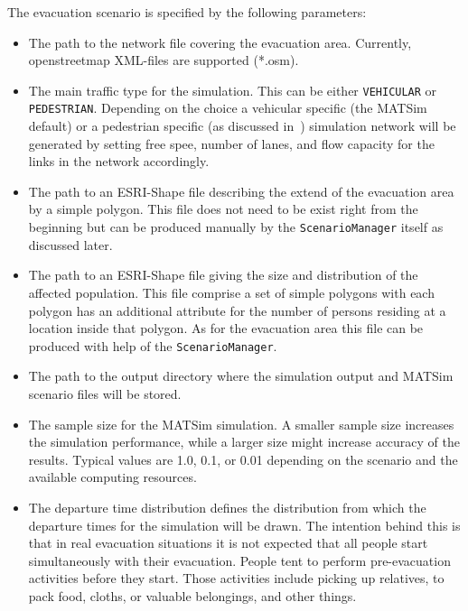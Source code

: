 The evacuation scenario is specified by the following parameters:
\begin{itemize}
\item The path to the network file covering the evacuation area. Currently, openstreetmap XML-files are supported (*.osm).
\item The main traffic type for the simulation. This can be either \lstinline+VEHICULAR+ or \lstinline+PEDESTRIAN+. Depending on the choice a vehicular specific (the MATSim default) or a pedestrian specific (as discussed in~\citet{LaemmelKluepfelNagel2009EvacPadangAtBookTimmermanns,Laemmel_PhDThesis_2011}) simulation network will be generated by setting free spee, number of lanes, and flow capacity for the links in the network accordingly.
\item The path to an ESRI-Shape file describing the extend of the evacuation area by a simple polygon. This file does not need to be exist right from the beginning but can be produced manually by the \lstinline+ScenarioManager+ itself as discussed later.
\item The path to an ESRI-Shape file giving the size and distribution of the affected population. This file comprise a set of simple polygons with each polygon has an additional attribute for the number of persons residing at a location inside that polygon. As for the evacuation area this file can be produced with help of the  \lstinline+ScenarioManager+.
\item The path to the output directory where the simulation output and MATSim scenario files will be stored.
\item The sample size for the MATSim simulation. A smaller sample size increases the simulation performance, while a larger size might increase accuracy of the results. Typical values are 1.0, 0.1, or 0.01 depending on the scenario and the available computing resources.
\item The departure time distribution defines the distribution from which the departure times for the simulation will be drawn. The intention behind this is that in real evacuation situations it is not expected that all people start simultaneously with their evacuation. 
People tent to perform pre-evacuation activities before they start. Those activities include picking up relatives, to pack food, cloths, or valuable belongings, and other things. 

\end{itemize}
